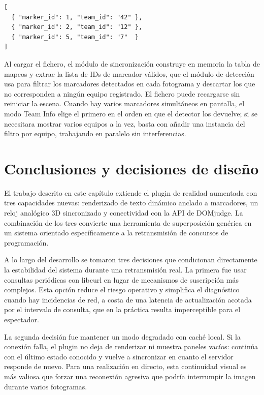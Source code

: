 \begin{verbatim}
[
  { "marker_id": 1, "team_id": "42" },
  { "marker_id": 2, "team_id": "12" },
  { "marker_id": 5, "team_id": "7"  }
]
\end{verbatim}
 
Al cargar el fichero, el módulo de sincronización construye en memoria la tabla de mapeos y
extrae la lista de IDs de marcador válidos, que el módulo de detección usa para filtrar los
marcadores detectados en cada fotograma y descartar los que no corresponden a ningún equipo
registrado. El fichero puede recargarse sin reiniciar la escena. Cuando hay varios marcadores
simultáneos en pantalla, el modo Team Info elige el primero en el orden en que el detector los
devuelve; si se necesitara mostrar varios equipos a la vez, basta con añadir una instancia del
filtro por equipo, trabajando en paralelo sin interferencias.
 
 
\section{Conclusiones y decisiones de diseño}
\label{sec:conclusiones_diseno_concursos}
 
El trabajo descrito en este capítulo extiende el plugin de realidad aumentada con tres
capacidades nuevas: renderizado de texto dinámico anclado a marcadores, un reloj analógico 3D
sincronizado y conectividad con la API de DOMjudge. La combinación de los tres convierte una
herramienta de superposición genérica en un sistema orientado específicamente a la retransmisión
de concursos de programación.
 
A lo largo del desarrollo se tomaron tres decisiones que condicionan directamente la estabilidad
del sistema durante una retransmisión real. La primera fue usar consultas periódicas con libcurl
en lugar de mecanismos de suscripción más complejos. Esta opción reduce el riesgo operativo y
simplifica el diagnóstico cuando hay incidencias de red, a costa de una latencia de actualización
acotada por el intervalo de consulta, que en la práctica resulta imperceptible para el espectador.
 
La segunda decisión fue mantener un modo degradado con caché local. Si la conexión falla, el
plugin no deja de renderizar ni muestra paneles vacíos: continúa con el último estado conocido
y vuelve a sincronizar en cuanto el servidor responde de nuevo. Para una realización en directo,
esta continuidad visual es más valiosa que forzar una reconexión agresiva que podría interrumpir
la imagen durante varios fotogramas.
 
